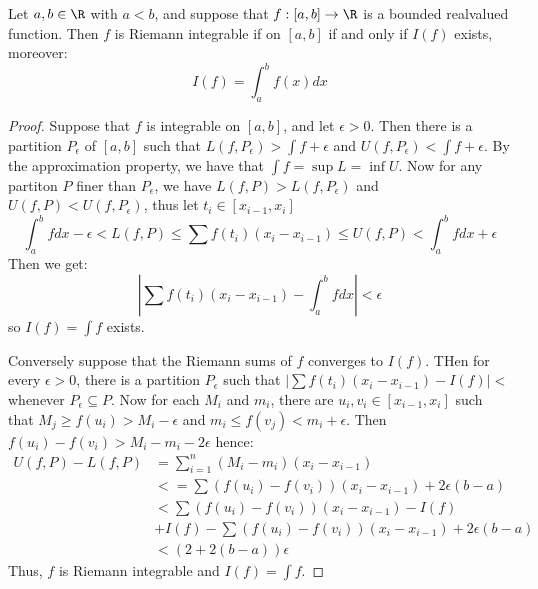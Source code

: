 \begin{theorem}\label{5.2.1}
    Let $a,b \in \R$ with  $a<b$, and suppose that  $f:[a,b] \rightarrow \R$ is
    a bounded realvalued function. Then  $f$ is Riemann integrable if on
    $[a,b]$ if and only if  $I(f)$ exists, moreover:
        \begin{equation}
            I(f)=\int_{a}^{b}{f(x) dx}		
        \end{equation} 
\end{theorem}
\begin{proof}
    Suppose that $f$ is integrable on  $[a,b]$, and let $\epsilon>0$. Then there
    is a partition $P_{\epsilon}$ of  $[a,b]$ such that
    $L(f,P_{\epsilon})>\int{f}+\epsilon$ and
    $U(f,P_{\epsilon})<\int{f}+\epsilon$. By the approximation property, we have
    that  $\int{f}=\sup{L}=\inf{U}$. Now for any partiton $P$ finer than
    $P_{\epsilon}$, we have $L(f,P)>L(f,P_{\epsilon})$ and
    $U(f,P)<U(f,P_{\epsilon})$, thus let  $t_i \in [x_{i-1},x_i]$
        \begin{equation*}
             \int_{a}^{b}{f dx}-\epsilon<L(f,P) \leq \sum{f(t_i)(x_i-x_{i-1})} \leq U(f,P)<\int_{a}^{b}{f dx}+\epsilon
        \end{equation*}
    Then we get:
        \begin{equation*}
            |\sum{f(t_i)(x_i-x_{i-1})}-\int_{a}^{b}{f dx}|<\epsilon
        \end{equation*}
        so $I(f)=\int{f}$ exists.

    Conversely suppose that the Riemann sums of $f$ converges to $I(f)$.
    THen for every  $\epsilon>0$, there is a partition  $P_{\epsilon}$ such 
    that $|\sum{f(t_i)(x_i-x_{i-1})}-I(f)|<$ whenever $P_{\epsilon}
    \subseteq P$. Now for each $M_i$ and  $m_i$, there are  $u_i,v_i \in
    [x_{i-1},x_i]$ such that $M_j \geq f(u_i)>M_i-\epsilon$ and  $m_i \leq
    f(v_j)<m_i+\epsilon$. Then $f(u_i)-f(v_i)>M_i-m_i-2\epsilon$ hence: 
        \begin{align*}
            U(f,P)-L(f,P) &= \sum_{i=1}^{n}{(M_i-m_i)(x_i-x_{i-1})} \\
                &<= \sum{(f(u_i)-f(v_i))(x_i-x_{i-1})}+2\epsilon(b-a) \\
                &<\sum{(f(u_i)-f(v_i))(x_i-x_{i-1})}-I(f) \\
                &+I(f)-\sum{(f(u_i)-f(v_i))(x_i-x_{i-1})}+2\epsilon(b-a) \\
                &<(2+2(b-a))\epsilon
        \end{align*}
        Thus, $f$ is Riemann integrable and  $I(f)=\int{f}$.
\end{proof}

